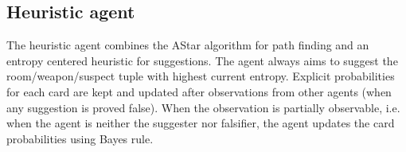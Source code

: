 \documentclass[a4paper,12pt]{proposal}
\begin{document}
\subsection{Heuristic agent}
The heuristic agent combines the AStar algorithm for path finding and an entropy centered heuristic for suggestions. The agent always aims to suggest the room/weapon/suspect tuple with highest current entropy. Explicit probabilities for each card are kept and updated after observations from other agents (when any suggestion is proved false). When the observation is partially observable, i.e. when the agent is neither the suggester nor falsifier, the agent updates the card probabilities using Bayes rule.




\newpage
 
\nocite{*}

\end{document}
